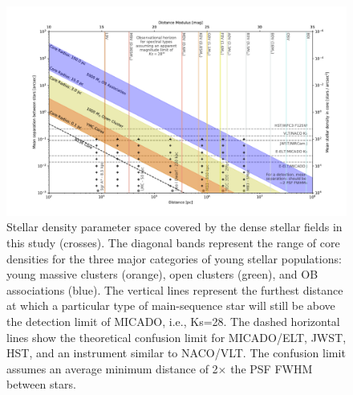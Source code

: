 \begin{figure}

    \centering
    \includegraphics[width=\textwidth]{images/resolved_stellar_densities.pdf}

    \caption{Stellar density parameter space covered by the dense stellar fields in this study (crosses). 
    The diagonal bands represent the range of core densities for the three major categories of young stellar populations: young massive clusters (orange), open clusters (green), and OB associations (blue). 
    The vertical lines represent the furthest distance at which a particular type of main-sequence star will still be above the detection limit of MICADO, i.e., Ks=28\m. The dashed horizontal lines show the theoretical confusion limit for MICADO/ELT, JWST, HST, and an instrument similar to NACO/VLT. The confusion limit assumes an average minimum distance of 2$\times$ the PSF FWHM between stars.
    }
    
    \label{fig:resolved_stellar_densities}
    
\end{figure}


